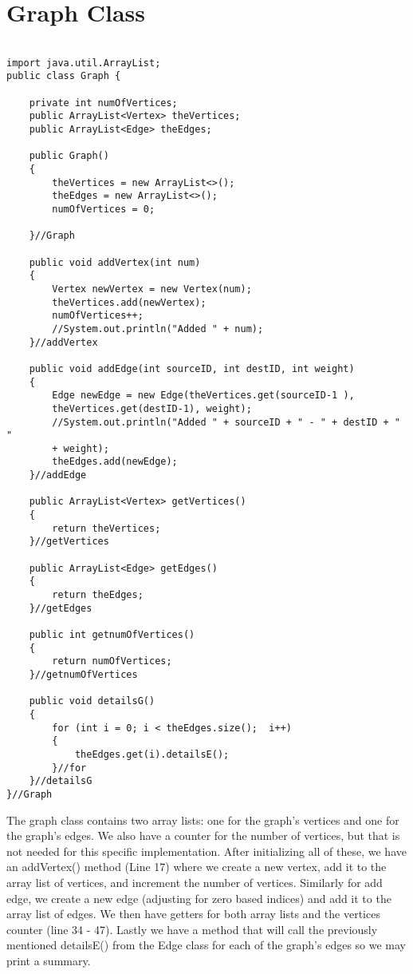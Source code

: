 \documentclass{article}
\begin{document}
\section{Graph Class}
\begin{lstlisting}[frame =single,
backgroundcolor = \color{grey!12}]

import java.util.ArrayList;
public class Graph {

	private int numOfVertices;
	public ArrayList<Vertex> theVertices;
	public ArrayList<Edge> theEdges;
	
	public Graph()
	{
		theVertices = new ArrayList<>();
		theEdges = new ArrayList<>();
		numOfVertices = 0;

	}//Graph
	
	public void addVertex(int num)
	{
		Vertex newVertex = new Vertex(num);
		theVertices.add(newVertex);
		numOfVertices++;
		//System.out.println("Added " + num);
	}//addVertex
	
	public void addEdge(int sourceID, int destID, int weight)
	{
		Edge newEdge = new Edge(theVertices.get(sourceID-1 ),
		theVertices.get(destID-1), weight);
		//System.out.println("Added " + sourceID + " - " + destID + " " 
		+ weight);
		theEdges.add(newEdge);
	}//addEdge
	
	public ArrayList<Vertex> getVertices()
	{
		return theVertices;
	}//getVertices
	
	public ArrayList<Edge> getEdges()
	{
		return theEdges;
	}//getEdges
	
	public int getnumOfVertices()
	{
		return numOfVertices;
	}//getnumOfVertices
	
	public void detailsG()
	{
		for (int i = 0; i < theEdges.size();  i++)
		{
			theEdges.get(i).detailsE();
		}//for
	}//detailsG
}//Graph

\end{lstlisting}
\large
The graph class contains two array lists: one for the graph's vertices and one for the graph's edges. We also have a counter for the number of vertices, but that is not needed for this specific implementation. After initializing all of these, we have an addVertex() method (Line 17) where we create a new vertex, add it to the array list of vertices, and increment the number of vertices. Similarly for add edge, we create a new edge (adjusting for zero based indices) and add it to the array list of edges. We then have getters for both array lists and the vertices counter (line 34 - 47). Lastly we have a method that will call the previously mentioned detailsE() from the Edge class for each of the graph's edges so we may print a summary. 
\end{document}
